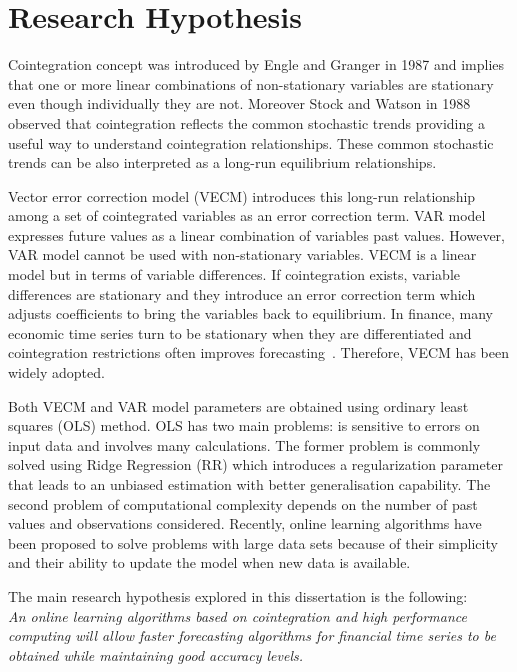 \section{Research Hypothesis}


Cointegration concept was introduced by Engle and Granger in 1987
\cite{engle1987} and implies that one or more linear combinations of
non-stationary variables are stationary even though individually they are not.
Moreover Stock and Watson in 1988 \cite{stock+watson1988} observed that
cointegration reflects the common stochastic trends providing a useful way to
understand cointegration relationships. These common stochastic trends can be
also interpreted as a long-run equilibrium relationships.

Vector error correction model (VECM) introduces this long-run relationship
among a set of cointegrated variables as an error correction term. VAR model
expresses future values as a linear combination of variables past values.
However, VAR model cannot be used with non-stationary variables. VECM is a
linear model but in terms of variable differences. If cointegration exists,
variable differences are stationary and they introduce an error correction term
which adjusts coefficients to bring the variables back to equilibrium. In
finance, many economic time series turn to be stationary when they are
differentiated and cointegration restrictions often improves
forecasting~\cite{duy1998}. Therefore, VECM has been widely adopted.

Both VECM and VAR model parameters are obtained using ordinary least squares
(OLS) method. OLS has two main problems: is sensitive to errors on input data
and involves many calculations. The former problem is commonly solved using
Ridge Regression (RR) \cite{hoerl1970} which introduces a regularization
parameter that leads to an unbiased estimation with better generalisation
capability. The second problem of computational complexity depends on the number
of past values and observations considered.  Recently, online learning
algorithms have been proposed to solve problems with large data sets because of
their simplicity and their ability to update the model when new data is
available. 

The main research hypothesis explored in this dissertation is the following:
\\

\textit{An online learning algorithms based on cointegration and high
performance computing will allow faster forecasting
algorithms for financial time series to be obtained while maintaining good accuracy levels.}


